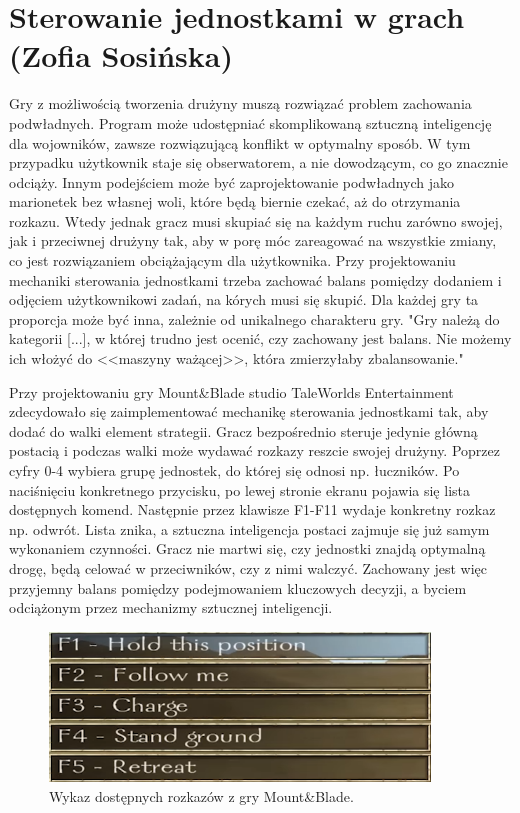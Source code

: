 \section{Sterowanie jednostkami w grach (Zofia Sosińska)}\label{chap:mb}
Gry z możliwością tworzenia drużyny muszą rozwiązać problem zachowania podwładnych. Program może udostępniać
skomplikowaną sztuczną inteligencję dla wojowników, zawsze rozwiązującą konflikt w optymalny sposób. W tym przypadku
użytkownik staje się obserwatorem, a nie dowodzącym, co go znacznie odciąży. Innym podejściem może być zaprojektowanie podwładnych jako 
marionetek bez własnej woli, które będą biernie czekać, aż do otrzymania rozkazu. Wtedy jednak gracz musi skupiać się na 
każdym ruchu zarówno swojej, jak i przeciwnej drużyny tak, aby w porę móc zareagować na wszystkie zmiany, co
jest rozwiązaniem obciążającym dla użytkownika. Przy projektowaniu mechaniki sterowania jednostkami trzeba zachować balans pomiędzy 
dodaniem i odjęciem użytkownikowi zadań, na kórych musi się skupić. Dla każdej gry ta proporcja może być inna, zależnie
od unikalnego charakteru gry. "Gry należą do kategorii [...], w której trudno jest ocenić, czy zachowany jest balans.
 Nie możemy ich włożyć do <<maszyny ważącej>>, która zmierzyłaby zbalansowanie."\cite{balancing_game}

Przy projektowaniu gry Mount\&Blade studio TaleWorlds Entertainment zdecydowało się zaimplementować mechanikę sterowania jednostkami tak, aby 
dodać do walki element strategii. Gracz bezpośrednio steruje jedynie główną postacią i podczas walki może wydawać rozkazy reszcie swojej drużyny. Poprzez
cyfry 0-4 wybiera grupę jednostek, do której się odnosi np. łuczników. Po naciśnięciu konkretnego przycisku, po lewej stronie ekranu pojawia się lista dostępnych komend.
Następnie przez klawisze F1-F11 wydaje konkretny rozkaz np. odwrót. Lista znika, a sztuczna inteligencja postaci zajmuje się już samym wykonaniem czynności.
Gracz nie martwi się, czy jednostki znajdą optymalną drogę, 
będą celować w przeciwników, czy z nimi walczyć. Zachowany jest więc przyjemny balans pomiędzy podejmowaniem kluczowych decyzji, a byciem odciążonym przez mechanizmy sztucznej inteligencji.

\begin{figure}[h!tbp]
    \centering
    \includegraphics[width=0.9\textwidth]{images/ui/commandsMountBla.png}
    \caption{Wykaz dostępnych rozkazów z gry Mount\&Blade.}\label{fig:MountnBlade}
    \label{fig:mnb}
\end{figure}
